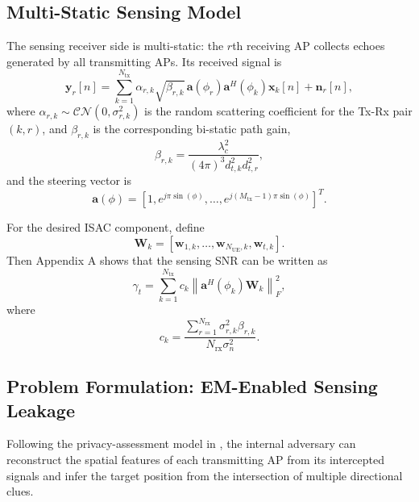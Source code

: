 \documentclass[conference,twocolumn,a4paper]{IEEEtran}
\begin{document}
\subsection{Multi-Static Sensing Model}
The sensing receiver side is multi-static: the $r$th receiving AP collects echoes generated by all transmitting APs. Its received signal is
\begin{equation}
\mathbf{y}_r[n]=\sum_{k=1}^{N_{\mathrm{tx}}}\alpha_{r,k}\sqrt{\beta_{r,k}}\,\mathbf{a}(\phi_r)\mathbf{a}^H(\phi_k)\mathbf{x}_k[n]+\mathbf{n}_r[n],
\label{eq:yr}
\end{equation}
where $\alpha_{r,k}\sim\mathcal{CN}(0,\sigma_{r,k}^2)$ is the random scattering coefficient for the Tx-Rx pair $(k,r)$, and $\beta_{r,k}$ is the corresponding bi-static path gain,
\begin{equation}
\beta_{r,k}=\frac{\lambda_c^2}{(4\pi)^3d_{t,k}^2d_{t,r}^2},
\label{eq:betark}
\end{equation}
and the steering vector is
\begin{equation}
\mathbf{a}(\phi)=\left[1,e^{j\pi\sin(\phi)},\ldots,e^{j(M_{\mathrm{tx}}-1)\pi\sin(\phi)}\right]^T.
\label{eq:steering}
\end{equation}

For the desired ISAC component, define
\begin{equation}
\mathbf{W}_k=\left[\mathbf{w}_{1,k},\ldots,\mathbf{w}_{N_{\mathrm{UE}},k},\mathbf{w}_{t,k}\right].
\end{equation}
Then Appendix A shows that the sensing SNR can be written as
\begin{equation}
\gamma_t=\sum_{k=1}^{N_{\mathrm{tx}}}c_k\left\|\mathbf{a}^H(\phi_k)\mathbf{W}_k\right\|_F^2,
\label{eq:snr-sensing}
\end{equation}
where
\begin{equation}
c_k=\frac{\sum_{r=1}^{N_{\mathrm{rx}}}\sigma_{r,k}^2\beta_{r,k}}{N_{\mathrm{rx}}\sigma_n^2}.
\label{eq:ck}
\end{equation}

\subsection{Problem Formulation: EM-Enabled Sensing Leakage}
Following the privacy-assessment model in \cite{dasilva2023multistaticcf}, the internal adversary can reconstruct the spatial features of each transmitting AP from its intercepted signals and infer the target position from the intersection of multiple directional clues.
\end{document}
